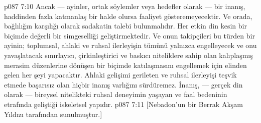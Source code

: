 \vs p087 7:10 Ancak --- ayinler, ortak söylemler veya hedefler olarak --- bir inanış, haddinden fazla katmanlaş bir halde olursa faaliyet gösteremeyecektir. Ve orada, bağlılığın karşılığı olarak sadakatin talebi bulunmalıdır. Her etkin din kesin bir biçimde değerli bir simgeselliği geliştirmektedir. Ve onun takipçileri bu türden bir ayinin; toplumsal, ahlaki ve ruhsal ilerleyişin tümünü yalnızca engelleyecek ve onu yavaşlatacak sınırlayıcı, çirkinleştirici ve baskıcı niteliklere sahip olan kalıplaşmış merasim düzenlerine dönüşen bir biçimde katılaşmasını engellemek için elinden gelen her şeyi yapacaktır. Ahlaki gelişimi gerileten ve ruhsal ilerleyişi teşvik etmede başarısız olan hiçbir inanış varlığını sürdüremez. İnanış, --- gerçek din olarak --- bireysel nitelikteki ruhsal deneyimin yaşayan ve faal bedeninin etrafında geliştiği iskeletsel yapıdır.
\vs p087 7:11 [Nebadon’un bir Berrak Akşam Yıldızı tarafından sunulmuştur.]

